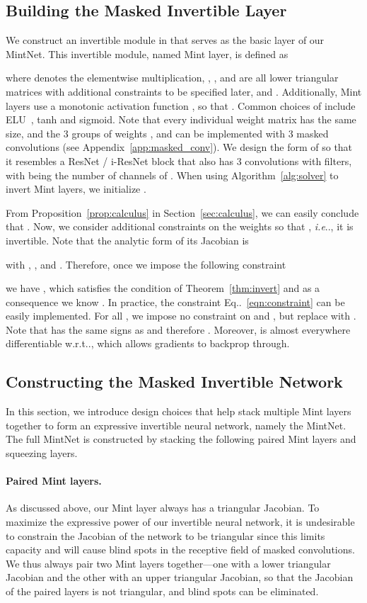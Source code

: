 \documentclass{article}
\makeatletter
\def\@onedot{\ifx\@let@token.\else.\null\fi\xspace}
\DeclareRobustCommand\onedot{\futurelet\@let@token\@onedot}
\newcommand{\eqnref}[1]{Eq\onedot~\eqref{#1}}
\newcommand{\algoref}[1]{Algorithm~\ref{#1}}
\newcommand{\secref}[1]{Section~\ref{#1}}
\newcommand{\thmref}[1]{Theorem~\ref{#1}}
\newcommand{\propref}[1]{Proposition~\ref{#1}}
\def\ie{\emph{i.e}\onedot}
\def\wrt{w.r.t\onedot}
\makeatother
\begin{document}
\subsection{Building the Masked Invertible Layer}\label{sec:layer}
We construct an invertible module in  that serves as the basic layer of our MintNet. This invertible module, named Mint layer, is defined as

where  denotes the elementwise multiplication, , , and  are all lower triangular matrices with additional constraints to be specified later, and . Additionally, Mint layers use a monotonic activation function , so that . Common choices of  include ELU~\cite{clevert2015fast}, tanh and sigmoid. Note that every individual weight matrix has the same size, and the 3 groups of weights ,  and  can be implemented with 3 masked convolutions (see Appendix~\ref{app:masked_conv}). We design the form of  so that it resembles a ResNet / i-ResNet block that also has 3 convolutions with  filters, with  being the number of channels of . When using \algoref{alg:solver} to invert Mint layers, we initialize .

From \propref{prop:calculus} in \secref{sec:calculus}, we can easily conclude that . Now, we consider additional constraints on the weights so that , \ie, it is invertible. Note that the analytic form of its Jacobian is

with , , and . Therefore, once we impose the following constraint

we have , which satisfies the condition of \thmref{thm:invert} and as a consequence we know . In practice, the constraint \eqnref{eqn:constraint} can be easily implemented. For all , we impose no constraint on  and , but replace  with . 
Note that  has the same signs as  and therefore . Moreover,  is almost everywhere differentiable \wrt , which allows gradients to backprop through.



\subsection{Constructing the Masked Invertible Network}
In this section, we introduce design choices that help stack multiple Mint layers together to form an expressive invertible neural network, namely the MintNet. The full MintNet is constructed by stacking the following paired Mint layers and squeezing layers.
\paragraph{Paired Mint layers.} As discussed above, our Mint layer  always has a triangular Jacobian. To maximize the expressive power of our invertible neural network, it is undesirable to constrain the Jacobian of the network to be triangular since this limits capacity and will cause blind spots in the receptive field of masked convolutions. We thus always pair two Mint layers together---one with a lower triangular Jacobian and the other with an upper triangular Jacobian, so that the Jacobian of the paired layers is not triangular, and blind spots can be eliminated.
\end{document}

